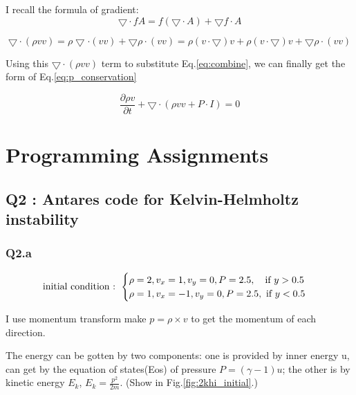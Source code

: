 \documentclass{article}
\begin{document}
I recall the formula of gradient:
$$
    \bigtriangledown \cdot fA=f (\bigtriangledown \cdot A)+\bigtriangledown f \cdot A
$$

$$
\bigtriangledown \cdot (\rho v v)
=\rho \bigtriangledown \cdot (v v)+\bigtriangledown \rho \cdot (v v)
=\rho (v \cdot \bigtriangledown) v+\rho (v \cdot \bigtriangledown) v+\bigtriangledown \rho \cdot (v v)
$$

Using this $\bigtriangledown \cdot (\rho v v)$ term to substitute Eq.\ref{eq:combine}, we can finally get the form of Eq.\ref{eq:p_conservation}


\begin{equation}
    \frac{\partial \rho v}{\partial t}+\bigtriangledown \cdot (\rho v v +P \cdot I)=0
    \label{eq:p_conservation}
\end{equation}

\section{Programming Assignments}

\subsection*{Q2 : Antares code for Kelvin-Helmholtz instability}
\subsubsection*{Q2.a}

\begin{equation}
    \mbox{initial condition : }
	\begin{cases}
	\rho=2,v_x=1,v_y=0, P=2.5, \mbox{\quad if } y>0.5\\
	\rho=1,v_x=-1,v_y=0, P=2.5, \mbox{ if } y<0.5
    \end{cases}
\end{equation}

I use momentum transform make $p=\rho \times v$ to get the momentum of each direction.

The energy can be gotten by two components: one is provided by inner energy u, can get by the equation of states(Eos) of pressure $P=(\gamma-1)u$;
the other is by kinetic energy $E_k$, $E_k=\frac{p^2}{2m}$.
(Show in Fig.\ref{fig:2khi_initial}.)
\end{document}
